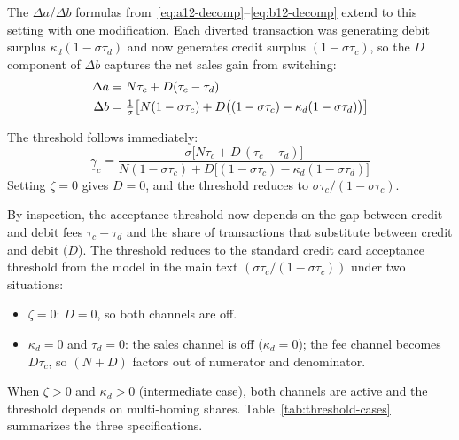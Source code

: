 \documentclass[main.tex]{subfiles}
\begin{document}
The $\Delta a$/$\Delta b$ formulas from~\eqref{eq:a12-decomp}--\eqref{eq:b12-decomp} extend to this setting with one modification.
Each diverted transaction was generating debit surplus $\kappa_d(1-\sigma\tau_d)$ and now generates credit surplus $(1-\sigma\tau_c)$, so the $D$ component of $\Delta b$ captures the net sales gain from switching:
\begin{align}
\Delta a &= N\tau_c + D(\tau_c - \tau_d) \notag\\
\Delta b &= \tfrac{1}{\sigma}\bigl[N(1-\sigma\tau_c) + D\bigl((1-\sigma\tau_c) - \kappa_d(1-\sigma\tau_d)\bigr)\bigr] \label{eq:general-delta-b}
\end{align}

The threshold follows immediately:
\begin{equation}
\underline{\gamma}_c = \frac{\sigma\bigl[N\tau_c + D\,(\tau_c - \tau_d)\bigr]}{N(1-\sigma\tau_c) + D\bigl[(1-\sigma\tau_c) - \kappa_d(1-\sigma\tau_d)\bigr]} \label{eq:general-credit-debit-threshold}
\end{equation}
Setting $\zeta = 0$ gives $D = 0$, and the threshold reduces to $\sigma\tau_c/(1-\sigma\tau_c)$.

By inspection, the acceptance threshold now depends on the gap between credit and debit fees $\tau_c - \tau_d$ and the share of transactions that substitute between credit and debit ($D$).
The threshold reduces to the standard credit card acceptance threshold from the model in the main text $(\sigma\tau_c/(1-\sigma\tau_c))$ under two situations:
\begin{itemize}
\item $\zeta = 0$: $D = 0$, so both channels are off.
\item $\kappa_d = 0$ and $\tau_d = 0$: the sales channel is off ($\kappa_d = 0$); the fee channel becomes $D\tau_c$, so $(N + D)$ factors out of numerator and denominator.
\end{itemize}

When $\zeta > 0$ and $\kappa_d > 0$ (intermediate case), both channels are active and the threshold depends on multi-homing shares.
Table~\ref{tab:threshold-cases} summarizes the three specifications.
\end{document}
